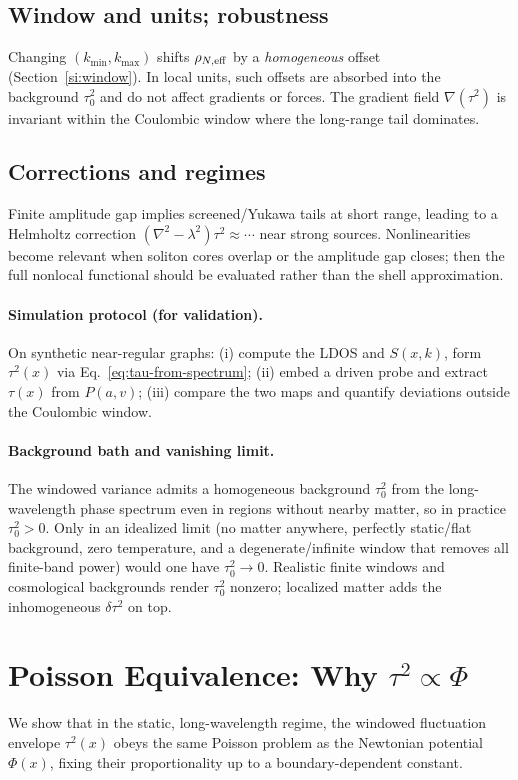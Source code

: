 \documentclass[11pt]{article}
\begin{document}
\subsection*{Window and units; robustness}
Changing $(k_{\min},k_{\max})$ shifts $\rho_{N,\rm eff}$ by a \emph{homogeneous} offset (Section~\ref{si:window}). In local units, such offsets are absorbed into the background $\tau_0^2$ and do not affect gradients or forces. The gradient field $\nabla(\tau^2)$ is invariant within the Coulombic window where the long-range tail dominates.

\subsection*{Corrections and regimes}
Finite amplitude gap implies screened/Yukawa tails at short range, leading to a Helmholtz correction $(\nabla^2-\lambda^2)\tau^2\approx\cdots$ near strong sources. Nonlinearities become relevant when soliton cores overlap or the amplitude gap closes; then the full nonlocal functional should be evaluated rather than the shell approximation.

\paragraph{Simulation protocol (for validation).} On synthetic near-regular graphs: (i) compute the LDOS and $S(x,k)$, form $\tau^2(x)$ via Eq.~\eqref{eq:tau-from-spectrum}; (ii) embed a driven probe and extract $\tau(x)$ from $P(a,v)$; (iii) compare the two maps and quantify deviations outside the Coulombic window.

\paragraph{Background bath and vanishing limit.} The windowed variance admits a homogeneous background $\tau_0^2$ from the long-wavelength phase spectrum even in regions without nearby matter, so in practice $\tau_0^2>0$. Only in an idealized limit (no matter anywhere, perfectly static/flat background, zero temperature, and a degenerate/infinite window that removes all finite-band power) would one have $\tau_0^2\to 0$. Realistic finite windows and cosmological backgrounds render $\tau_0^2$ nonzero; localized matter adds the inhomogeneous $\delta\tau^2$ on top.

\section{Poisson Equivalence: Why $\tau^2 \propto \Phi$}\label{si:tau-poisson}
We show that in the static, long-wavelength regime, the windowed fluctuation envelope $\tau^2(x)$ obeys the same Poisson problem as the Newtonian potential $\Phi(x)$, fixing their proportionality up to a boundary-dependent constant.
\end{document}
